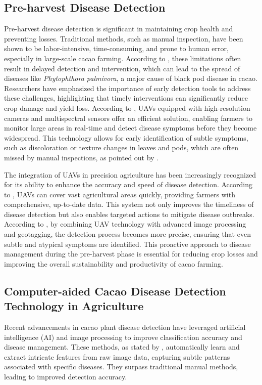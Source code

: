 \subsection{Pre-harvest Disease Detection}
Pre-harvest disease detection is significant in maintaining crop health and preventing losses. Traditional methods, such as manual inspection, have been shown to be labor-intensive, time-consuming, and prone to human error, especially in large-scale cacao farming. According to \cite{Tan2018}, these limitations often result in delayed detection and intervention, which can lead to the spread of diseases like \textit{Phytophthora palmivora}, a major cause of black pod disease in cacao. Researchers have emphasized the importance of early detection tools to address these challenges, highlighting that timely interventions can significantly reduce crop damage and yield loss. According to \cite{Yadav2024}, UAVs equipped with high-resolution cameras and multispectral sensors offer an efficient solution, enabling farmers to monitor large areas in real-time and detect disease symptoms before they become widespread. This technology allows for early identification of subtle symptoms, such as discoloration or texture changes in leaves and pods, which are often missed by manual inspections, as pointed out by \cite{Upadhyay2025}.

The integration of UAVs in precision agriculture has been increasingly recognized for its ability to enhance the accuracy and speed of disease detection. According to \cite{Vyas2023}, UAVs can cover vast agricultural areas quickly, providing farmers with comprehensive, up-to-date data. This system not only improves the timeliness of disease detection but also enables targeted actions to mitigate disease outbreaks. According to \cite{Taesiri2023}, by combining UAV technology with advanced image processing and geotagging, the detection process becomes more precise, ensuring that even subtle and atypical symptoms are identified. This proactive approach to disease management during the pre-harvest phase is essential for reducing crop losses and improving the overall sustainability and productivity of cacao farming.

\subsection{Computer-aided Cacao Disease Detection Technology in Agriculture}
Recent advancements in cacao plant disease detection have leveraged artificial intelligence (AI) and image processing to improve classification accuracy and disease management. These methods, as stated by \cite{Upadhyay2025}, automatically learn and extract intricate features from raw image data, capturing subtle patterns associated with specific diseases. They surpass traditional manual methods, leading to improved detection accuracy.

